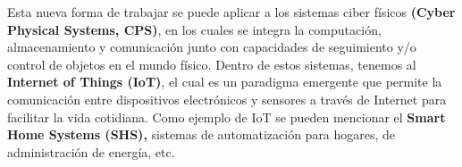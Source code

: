 Esta nueva forma de trabajar se puede aplicar a los sistemas ciber físicos \textbf{(Cyber Physical Systems, CPS)}, en los cuales se integra la computación, almacenamiento y comunicación junto con capacidades de seguimiento y/o control de objetos en el mundo físico.
Dentro de estos sistemas, tenemos al \textbf{Internet of Things (IoT)}, el cual es un paradigma emergente que permite la comunicación entre dispositivos electrónicos y sensores a través de Internet para facilitar la vida cotidiana. Como ejemplo de IoT se pueden mencionar el \textbf{Smart Home Systems (SHS),} sistemas de automatización para hogares, de administración de energía, etc.

